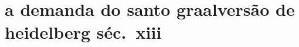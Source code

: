 \documentclass[10.5pt]{hedrabook}
\begin{document}
\hedratoc




\part[a demanda do santo graal\\ versão de heidelberg séc.~xiii]{a demanda do santo graal\break versão de heidelberg séc.~xiii} 




\ifdefined\printcheck\printcheck\fi
\end{document}
